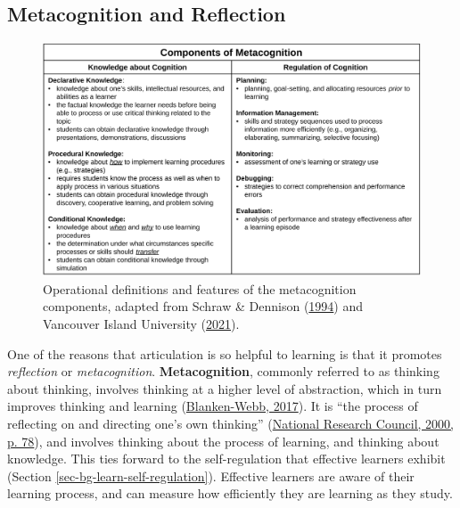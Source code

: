 \documentclass[letterpaper, nobind]{templates/ociamthesis}
\begin{document}
\hypertarget{sec-bg-learn-metacognition}{%
\subsection{Metacognition and Reflection}\label{sec-bg-learn-metacognition}}

\begin{figure}

{\centering \includegraphics[width=1\linewidth]{figs/metacognition-components} 

}

\caption[Components of metacognition.]{Operational definitions and features of the metacognition components, adapted from Schraw \& Dennison (\protect\hyperlink{ref-schraw1994assessing}{1994}) and Vancouver Island University (\protect\hyperlink{ref-viu2021mai}{2021}).}\label{fig:metacognition-components}
\end{figure}





One of the reasons that articulation is so helpful to learning is that
it promotes \emph{reflection} or \emph{metacognition}. \textbf{Metacognition}, commonly
referred to as thinking about thinking, involves thinking at a higher
level of abstraction, which in turn improves thinking and learning
(\protect\hyperlink{ref-blanken2017metacognition}{Blanken-Webb, 2017}). It is ``the process of reflecting on and
directing one's own thinking'' (\protect\hyperlink{ref-council2000how}{National Research Council, 2000, p. 78}), and involves
thinking about the process of learning, and thinking about knowledge.
This ties forward to the self-regulation that effective learners exhibit
(Section \ref{sec-bg-learn-self-regulation}). Effective learners are aware
of their learning process, and can measure how efficiently they are
learning as they study.
\end{document}
